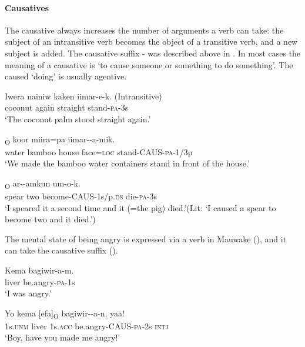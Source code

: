 \paragraph[Causatives]{Causatives}
{}
The causative always increases the number of arguments a verb can take: the subject of an intransitive verb becomes the object of a transitive verb, and a new subject is added. The causative suffix - was described above in . In most cases the meaning of a causative is `to cause someone or something to do something'. The caused `doing' is usually agentive. 

\ea%
\label{ex:x997}
\gll Iwera nainiw kaken iimar-e-k. (Intransitive) \\
coconut again straight stand-\textsc{pa}-3s\\
\glt`The coconut palm stood straight again.'
\z

\ea%
\label{ex:x998}
\textsubscript{O} koor miira=pa iimar--a-mik. \\
water bamboo house face=\textsc{loc} stand-CAUS-\textsc{pa}-1/3p\\
\glt`We made the bamboo water containers stand in front of the house.'
\z

\ea%
\label{ex:x992}
\textsubscript{O} ar--amkun um-o-k. \\
spear two become-CAUS-1s/p.\textsc{ds} die-\textsc{pa}-3s\\
\glt`I speared it a second time and it (=the pig) died.'(Lit: `I caused a spear to become two and it died.')
\z

The mental state of being angry is expressed via a verb in Mauwake (), and it can take the causative suffix ().

\ea%
\label{ex:x993}
\gll Kema bagiwir-a-m. \\
liver be.angry-\textsc{pa}-1s\\
\glt`I was angry.'
\z

\ea%
\label{ex:x994}
\gll Yo kema [efa]\textsubscript{O} bagiwir--a-n, yaa! \\
1s.\textsc{unm} liver 1s.\textsc{acc} be.angry-CAUS-\textsc{pa}-2s \textsc{intj}\\
\glt`Boy, have you made me angry!'
\z

